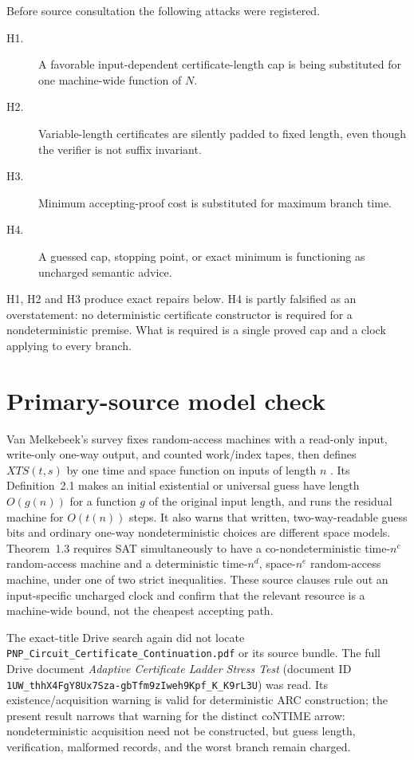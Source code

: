 \documentclass[11pt]{article}
\begin{document}
Before source consultation the following attacks were registered.
\begin{description}
\item[H1.] A favorable input-dependent certificate-length cap is being
  substituted for one machine-wide function of $N$.
\item[H2.] Variable-length certificates are silently padded to fixed length,
  even though the verifier is not suffix invariant.
\item[H3.] Minimum accepting-proof cost is substituted for maximum branch
  time.
\item[H4.] A guessed cap, stopping point, or exact minimum is functioning as
  uncharged semantic advice.
\end{description}
H1, H2 and H3 produce exact repairs below.  H4 is partly falsified as an
overstatement: no deterministic certificate constructor is required for a
nondeterministic premise.  What is required is a single proved cap and a
clock applying to every branch.

\section{Primary-source model check}

Van Melkebeek's survey fixes random-access machines with a read-only input,
write-only one-way output, and counted work/index tapes, then defines
$XTS(t,s)$ by one time and space function on inputs of length $n$
\cite[Sec.~2.1--2.2]{vm}.  Its Definition~2.1 makes an initial existential or
universal guess have length $O(g(n))$ for a function $g$ of the original
input length, and runs the residual machine for $O(t(n))$ steps.  It also
warns that written, two-way-readable guess bits and ordinary one-way
nondeterministic choices are different space models.  Theorem~1.3 requires
SAT simultaneously to have a co-nondeterministic time-$n^c$ random-access
machine and a deterministic time-$n^d$, space-$n^e$ random-access machine,
under one of two strict inequalities.  These source clauses rule out an
input-specific uncharged clock and confirm that the relevant resource is a
machine-wide bound, not the cheapest accepting path.

The exact-title Drive search again did not locate
\texttt{PNP\_Circuit\_Certificate\_Continuation.pdf} or its source bundle.
The full Drive document \emph{Adaptive Certificate Ladder Stress Test}
(document ID
\texttt{1UW\_thhX4FgY8Ux7Sza-gbTfm9zIweh9Kpf\_K\_K9rL3U}) was read.  Its
existence/acquisition warning is valid for deterministic ARC construction;
the present result narrows that warning for the distinct coNTIME arrow:
nondeterministic acquisition need not be constructed, but guess length,
verification, malformed records, and the worst branch remain charged.
\end{document}

